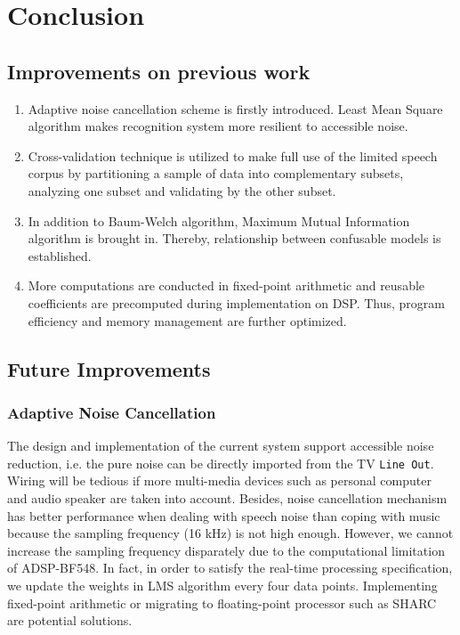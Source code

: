 \chapter{Conclusion}
\label{chapter:conclusion}


\section{Improvements on previous work}

\begin{enumerate}
\item Adaptive noise cancellation scheme is firstly introduced. Least Mean Square algorithm makes recognition system more resilient to accessible noise.
\item Cross-validation technique is utilized to make full use of the limited speech corpus by partitioning a sample of data into complementary subsets, analyzing one subset and validating by the other subset.
\item In addition to Baum-Welch algorithm, Maximum Mutual Information algorithm is brought in. Thereby, relationship between confusable models is established.
\item More computations are conducted in fixed-point arithmetic and reusable coefficients are precomputed during implementation on DSP. Thus, program efficiency and memory management are further optimized.
\end{enumerate}


\section{Future Improvements}

\subsection{Adaptive Noise Cancellation}

The design and implementation of the current system support accessible noise reduction, i.e. the pure noise can be directly imported from the TV \texttt{Line Out}. Wiring will be tedious if more multi-media devices such as personal computer and audio speaker are taken into account. Besides, noise cancellation mechanism has better performance when dealing with speech noise than coping with music because the sampling frequency (16 kHz) is not high enough. However, we cannot increase the sampling frequency disparately due to the computational limitation of ADSP-BF548. In fact, in order to satisfy the real-time processing specification, we update the weights in LMS algorithm every four data points. Implementing fixed-point arithmetic or migrating to floating-point processor such as SHARC\textsuperscript{\textregistered} are potential solutions.

